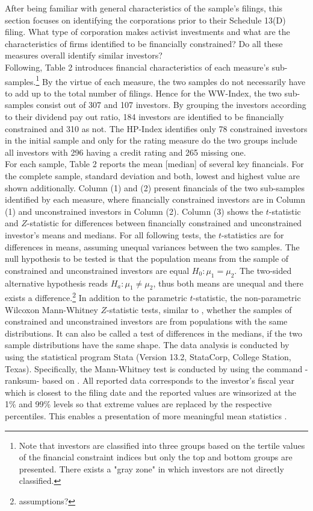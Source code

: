 \documentclass[12pt]{article}
\begin{document}
After being familiar with general characteristics of the sample's filings, this section focuses on identifying the corporations prior to their Schedule 13(D) filing. What type of corporation makes activist investments and what are the characteristics of firms identified to be financially constrained? Do all these measures overall identify similar investors?\\
Following, Table 2 introduces financial characteristics of each measure's sub-samples.\footnote{Note that investors are classified into three groups based on the tertile values of the financial constraint indices but only the top and bottom groups are presented. There exists a "gray zone" in which investors are not directly classified.} By the virtue of each measure, the two samples do not necessarily have to add up to the total number of filings. Hence for the WW-Index, the two sub-samples consist out of 307 and 107 investors. By grouping the investors according to their dividend pay out ratio, 184 investors are identified to be financially constrained and 310 as not. The HP-Index identifies only 78 constrained investors in the initial sample and only for the rating measure do the two groups include all investors with 296 having a credit rating and 265 missing one.\\
For each sample, Table 2 reports the mean [median] of several key financials. For the complete sample, standard deviation and both, lowest and highest value are shown additionally. Column (1) and (2) present financials of the two sub-samples identified by each measure, where financially constrained investors are in Column (1) and unconstrained investors in Column (2). Column (3) shows the $t$-statistic and $Z$-statistic for differences between financially constrained and unconstrained investor's means and medians. For all following tests, the $t$-statistics are for differences in means, assuming unequal variances between the two samples. The null hypothesis to be tested is that the population means from the sample of constrained and unconstrained investors are equal $H_{0}: \mu_{1}=\mu_{2}$. The two-sided alternative hypothesis reads $H_{a}: \mu_{1}\neq\mu_{2}$, thus both means are unequal and there exists a difference.\footnote{assumptions?} In addition to the parametric $t$-statistic, the non-parametric Wilcoxon Mann-Whitney $Z$-statistic tests, similar to \citet[p.201]{Klein2009}, whether the samples of constrained and unconstrained investors are from populations with the same distributions. It can also be called a test of differences in the medians, if the two sample distributions have the same shape. The data analysis is conducted by using the statistical program Stata (Version 13.2, StataCorp, College Station, Texas). Specifically, the Mann-Whitney test is conducted by using the command -ranksum- based on \citet[p.59]{Mann1947}. All reported data corresponds to the investor's fiscal year which is closest to the filing date and the reported values are winsorized at the 1\% and 99\% levels so that extreme values are replaced by the respective percentiles. This enables a presentation of more meaningful mean statistics \citep[p.203]{Klein2009}.   
\end{document}

